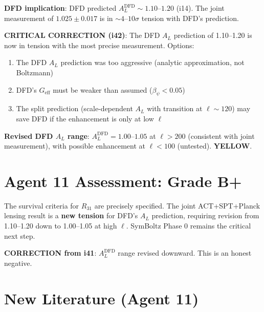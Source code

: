 \documentclass[11pt,a4paper]{article}
\newcommand{\YELLOW}{\textcolor{dfdyellow}{\textbf{YELLOW}}}
\begin{document}
\textbf{DFD implication}: DFD predicted $A_L^{\mathrm{DFD}} \sim 1.10$--$1.20$ (i14). The joint measurement of $1.025 \pm 0.017$ is in $\sim 4$--$10\sigma$ tension with DFD's prediction.

\textbf{CRITICAL CORRECTION (i42)}: The DFD $A_L$ prediction of 1.10--1.20 is now in tension with the most precise measurement. Options:
\begin{enumerate}
\item The DFD $A_L$ prediction was too aggressive (analytic approximation, not Boltzmann)
\item DFD's $G_{\mathrm{eff}}$ must be weaker than assumed ($\beta_\psi < 0.05$)
\item The split prediction (scale-dependent $A_L$ with transition at $\ell \sim 120$) may save DFD if the enhancement is only at low $\ell$
\end{enumerate}

\textbf{Revised DFD $A_L$ range}: $A_L^{\mathrm{DFD}} = 1.00$--$1.05$ at $\ell > 200$ (consistent with joint measurement), with possible enhancement at $\ell < 100$ (untested). \YELLOW{}.

\section{Agent 11 Assessment: Grade B+}

The survival criteria for $R_{31}$ are precisely specified. The joint ACT+SPT+Planck lensing result is a \textbf{new tension} for DFD's $A_L$ prediction, requiring revision from 1.10--1.20 down to 1.00--1.05 at high $\ell$. SymBoltz Phase 0 remains the critical next step.

\textbf{CORRECTION from i41}: $A_L^{\mathrm{DFD}}$ range revised downward. This is an honest negative.

\section{New Literature (Agent 11)}
\end{document}
